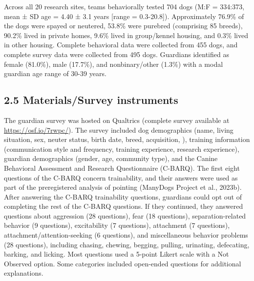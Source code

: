 \documentclass[
  pub,floatsintext]{apa6}
\begin{document}
Across all 20 research sites, teams behaviorally tested 704 dogs (M:F = 334:373, mean ± SD age = 4.40 ± 3.1 years {[}range = 0.3-20.8{]}). Approximately 76.9\% of the dogs were spayed or neutered, 53.8\% were purebred (comprising 85 breeds), 90.2\% lived in private homes, 9.6\% lived in group/kennel housing, and 0.3\% lived in other housing. Complete behavioral data were collected from 455 dogs, and complete survey data were collected from 495 dogs. Guardians identified as female (81.0\%), male (17.7\%), and nonbinary/other (1.3\%) with a modal guardian age range of 30-39 years.

\hypertarget{materialssurvey-instruments}{%
\subsection{2.5 Materials/Survey instruments}\label{materialssurvey-instruments}}

The guardian survey was hosted on Qualtrics (complete survey available at \url{https://osf.io/7rwpc/}). The survey included dog demographics (name, living situation, sex, neuter status, birth date, breed, acquisition, ), training information (communication style and frequency, training experience, research experience), guardian demographics (gender, age, community type), and the Canine Behavioral Assessment and Research Questionnaire (C-BARQ). The first eight questions of the C-BARQ concern trainability, and their answers were used as part of the preregistered analysis of pointing (ManyDogs Project et al., 2023b). After answering the C-BARQ trainability questions, guardians could opt out of completing the rest of the C-BARQ questions. If they continued, they answered questions about aggression (28 questions), fear (18 questions), separation-related behavior (9 questions), excitability (7 questions), attachment (7 questions), attachment/attention-seeking (6 questions), and miscellaneous behavior problems (28 questions), including chasing, chewing, begging, pulling, urinating, defecating, barking, and licking. Most questions used a 5-point Likert scale with a Not Observed option. Some categories included open-ended questions for additional explanations.
\end{document}
